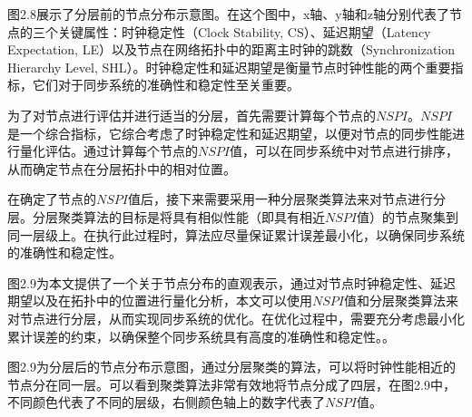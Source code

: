 \documentclass[UTF8,a4paper,12pt]{ctexart}
\numberwithin{equation}{section}
\begin{document}
	图2.8展示了分层前的节点分布示意图。在这个图中，x轴、y轴和z轴分别代表了节点的三个关键属性：时钟稳定性（Clock Stability, CS）、延迟期望（Latency Expectation, LE）以及节点在网络拓扑中的距离主时钟的跳数（Synchronization Hierarchy Level, SHL）。时钟稳定性和延迟期望是衡量节点时钟性能的两个重要指标，它们对于同步系统的准确性和稳定性至关重要。
	
	为了对节点进行评估并进行适当的分层，首先需要计算每个节点的$NSPI$。$NSPI$是一个综合指标，它综合考虑了时钟稳定性和延迟期望，以便对节点的同步性能进行量化评估。通过计算每个节点的$NSPI$值，可以在同步系统中对节点进行排序，从而确定节点在分层拓扑中的相对位置。
	
	在确定了节点的$NSPI$值后，接下来需要采用一种分层聚类算法来对节点进行分层。分层聚类算法的目标是将具有相似性能（即具有相近$NSPI$值）的节点聚集到同一层级上。在执行此过程时，算法应尽量保证累计误差最小化，以确保同步系统的准确性和稳定性。
	
	图2.9为本文提供了一个关于节点分布的直观表示，通过对节点时钟稳定性、延迟期望以及在拓扑中的位置进行量化分析，本文可以使用$NSPI$值和分层聚类算法来对节点进行分层，从而实现同步系统的优化。在优化过程中，需要充分考虑最小化累计误差的约束，以确保整个同步系统具有高度的准确性和稳定性。。
	\begin{figure}[H] 
	\end{figure}
	
	图2.9为分层后的节点分布示意图，通过分层聚类的算法，可以将时钟性能相近的节点分在同一层。可以看到聚类算法非常有效地将节点分成了四层，在图2.9中，不同颜色代表了不同的层级，右侧颜色轴上的数字代表了$NSPI$值。
	
\end{document}
